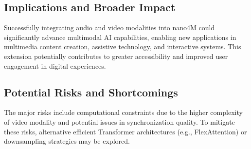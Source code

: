 \documentclass[10pt,conference,compsocconf]{IEEEtran}
\begin{document}
\subsection{Implications and Broader Impact}
Successfully integrating audio and video modalities into nano4M could significantly advance multimodal AI capabilities, enabling new applications in multimedia content creation, assistive technology, and interactive systems. This extension potentially contributes to greater accessibility and improved user engagement in digital experiences.

\subsection{Potential Risks and Shortcomings}
The major risks include computational constraints due to the higher complexity of video modality and potential issues in synchronization quality. To mitigate these risks, alternative efficient Transformer architectures (e.g., FlexAttention) or downsampling strategies may be explored.



\end{document}
